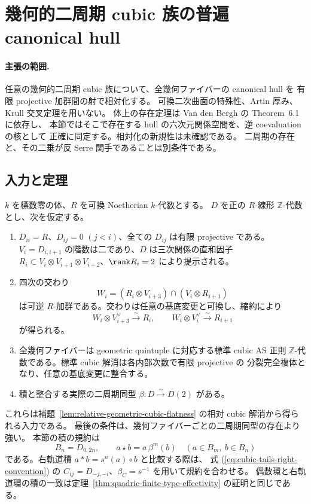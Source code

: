 \section{幾何的二周期 cubic 族の普遍 canonical hull}
\label{sec:universal-cubic-hull}
\paragraph{主張の範囲.}
任意の幾何的二周期 cubic 族について、全幾何ファイバーの canonical hull を
有限 projective 加群間の射で相対化する。
可換二次曲面の特殊性、Artin 厚み、Krull 交叉定理を用いない。
体上の存在定理は Van den Bergh の Theorem~6.1 に依存し、
本節ではそこで存在する hull の六次元関係空間を、逆 coevaluation の核として
正確に同定する。相対化の新規性は未確認である。
二周期の存在と、その二乗が反 Serre 関手であることは別条件である。

\subsection{入力と定理}

$k$ を標数零の体、$R$ を可換 Noetherian $k$-代数とする。
$D$ を正の $R$-線形 $\mathbb Z$-代数とし、次を仮定する。
\begin{enumerate}
\item $D_{ii}=R$、$D_{ij}=0$ $(j<i)$、全ての $D_{ij}$ は有限 projective である。
  $V_i=D_{i,i+1}$ の階数は二であり、$D$ は三次関係の直和因子
  $R_i\subset V_i\otimes V_{i+1}\otimes V_{i+2}$、$\rank R_i=2$ により提示される。
\item 四次の交わり
  \[
  W_i=(R_i\otimes V_{i+3})\cap(V_i\otimes R_{i+1})
  \]
  は可逆 $R$-加群である。交わりは任意の基底変更と可換し、縮約により
  \[
  W_i\otimes V_{i+3}^{\vee}\xrightarrow{\sim}R_i,
  \qquad W_i\otimes V_i^{\vee}\xrightarrow{\sim}R_{i+1}
  \tag{UH-1}\label{hull-eq:coevaluation}
  \]
  が得られる。
\item 全幾何ファイバーは geometric quintuple に対応する標準 cubic AS 正則
  $\mathbb Z$-代数である。標準 cubic 解消は各内部次数で有限 projective の
  分裂完全複体となり、任意の基底変更に整合する。
\item 積と整合する実際の二周期同型 $\beta:D\xrightarrow{\sim}D(2)$ がある。
\end{enumerate}
これらは補題~\ref{lem:relative-geometric-cubic-flatness} の相対 cubic 解消から得られる入力である。
最後の条件は、幾何ファイバーごとの二周期同型の存在より強い。
本節の積の規約は
\[
 B_n=D_{0,2n},\qquad a\star b=a\,\beta^m(b)
 \quad(a\in B_m,\ b\in B_n)
 \tag{UH-2}\label{hull-eq:product}
\]
である。右軌道積 $a*b=s^n(a)\circ b$ と比較する際は、
式 (\ref{eq:cubic-tails-right-convention}) の
$C_{ij}=D_{-j,-i}$、$\beta_C=s^{-1}$ を用いて規約を合わせる。
偶数環と右軌道環の積の一致は定理~\ref{thm:quadric-finite-type-effectivity} の証明と同じである。


